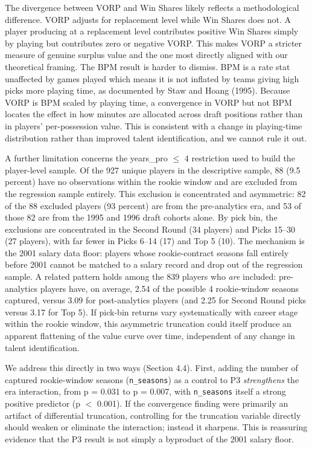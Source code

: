 \documentclass[12pt,letterpaper]{article}
\begin{document}
The divergence between VORP and Win Shares likely reflects a methodological difference. VORP adjusts for replacement level while Win Shares does not. A player producing at a replacement level contributes positive Win Shares simply by playing but contributes zero or negative VORP. This makes VORP a stricter measure of genuine surplus value and the one most directly aligned with our theoretical framing. The BPM result is harder to dismiss. BPM is a rate stat unaffected by games played which means it is not inflated by teams giving high picks more playing time, as documented by Staw and Hoang (1995). Because VORP is BPM scaled by playing time, a convergence in VORP but not BPM locates the effect in how minutes are allocated across draft positions rather than in players' per-possession value. This is consistent with a change in playing-time distribution rather than improved talent identification, and we cannot rule it out.

A further limitation concerns the years\_pro $\leq$ 4 restriction used to build the player-level sample. Of the 927 unique players in the descriptive sample, 88 (9.5 percent) have no observations within the rookie window and are excluded from the regression sample entirely. This exclusion is concentrated and asymmetric: 82 of the 88 excluded players (93 percent) are from the pre-analytics era, and 53 of those 82 are from the 1995 and 1996 draft cohorts alone. By pick bin, the exclusions are concentrated in the Second Round (34 players) and Picks 15--30 (27 players), with far fewer in Picks 6--14 (17) and Top 5 (10). The mechanism is the 2001 salary data floor: players whose rookie-contract seasons fall entirely before 2001 cannot be matched to a salary record and drop out of the regression sample. A related pattern holds among the 839 players who \emph{are} included: pre-analytics players have, on average, 2.54 of the possible 4 rookie-window seasons captured, versus 3.09 for post-analytics players (and 2.25 for Second Round picks versus 3.17 for Top 5). If pick-bin returns vary systematically with career stage within the rookie window, this asymmetric truncation could itself produce an apparent flattening of the value curve over time, independent of any change in talent identification.

We address this directly in two ways (Section 4.4). First, adding the number of captured rookie-window seasons (\texttt{n\_seasons}) as a control to P3 \emph{strengthens} the era interaction, from p = 0.031 to p = 0.007, with \texttt{n\_seasons} itself a strong positive predictor (p $<$ 0.001). If the convergence finding were primarily an artifact of differential truncation, controlling for the truncation variable directly should weaken or eliminate the interaction; instead it sharpens. This is reassuring evidence that the P3 result is not simply a byproduct of the 2001 salary floor.
\end{document}
